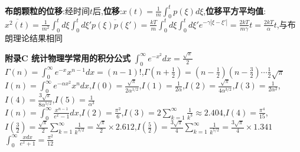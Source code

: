 \documentclass[10pt,a4paper]{article}
\begin{document}
\begin{multicols}{2}
\textbf{布朗颗粒的位移}:经时间$t$后,\textbf{位移}:$x(t)=\frac{1}{m}\int_0^tp(\xi)d\xi$,\textbf{位移平方平均值}:$\overline{x^2(t)}=\frac{1}{m^2}\int_0^td\xi\int_0^td\xi'\overline{p(\xi)p(\xi')}=\frac{kT}{m}\int_0^td\xi\int_0^td\xi'e^{-\gamma|\xi-\xi'|}=\frac{2kT}{m\gamma}t=\frac{2kT}{\alpha}t$,与布朗理论结果相同
\end{multicols}

\begin{multicols}{2}
\noindent\textbf{附录C 统计物理学常用的积分公式}
$\int_0^{\infty}e^{-x^2}dx=\frac{\sqrt{\pi}}{2}$\quad\quad
$\Gamma(n)=\int_0^{\infty}e^{-x}x^{n-1}dx=(n-1)!$,$\Gamma(n+\frac{1}{2})=(n-\frac{1}{2})(n-\frac{3}{2})\cdots\frac{1}{2}\sqrt{\pi}$\quad\quad
$I(n)=\int_0^{\infty}e^{-\alpha x^2}x^ndx$,$I(0)=\frac{\sqrt{\pi}}{2\alpha^{1/2}}$,$I(1)=\frac{1}{2\alpha}$,$I(2)=\frac{\sqrt{\pi}}{4\alpha^{3/2}}$,$I(3)=\frac{1}{2\alpha^2}$,$I(4)=\frac{3\sqrt{\pi}}{8\alpha^{5/2}}$,$I(5)=\frac{1}{\alpha^3}$\\
$I(n)=\int_0^{\infty}\frac{x^{n-1}}{e^x-1}dx$,$I(2)=\frac{\pi^2}{6}$,$I(3)=2\sum_{k=1}^{\infty}\frac{1}{k^3}\approx2.404$,$I(4)=\frac{\pi^4}{15}$,$I(\frac{3}{2})=\frac{\sqrt{\pi}}{2}\sum_{k=1}^{\infty}\frac{1}{k^{3/2}}=\frac{\sqrt{\pi}}{2}\times2.612$,$I(\frac{5}{2})=\frac{3\sqrt{\pi}}{4}\sum_{k=1}^{\infty}\frac{1}{k^{5/2}}=\frac{3\sqrt{\pi}}{4}\times1.341$\quad\quad
$\int_0^{\infty}\frac{xdx}{e^x+1}=\frac{\pi^2}{12}$
\end{multicols}
\end{document}
